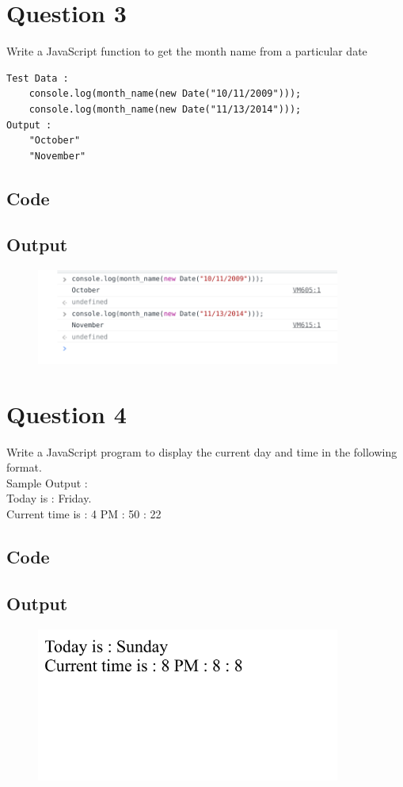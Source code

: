 \documentclass{article}
\begin{document}
\newpage
\section*{Question 3}
Write a JavaScript function to get the month name from a particular date
\begin{lstlisting}
Test Data :
    console.log(month_name(new Date("10/11/2009")));
    console.log(month_name(new Date("11/13/2014")));
Output :
    "October"
    "November"
\end{lstlisting}
\subsection*{Code}

\subsection*{Output}
\begin{figure}[H]
    \centering
    \includegraphics[width=10cm]{3/out.png}
\end{figure}

\newpage
\section*{Question 4}
Write a JavaScript program to display the current day and time in the
following format. \\
Sample Output : \\
Today is : Friday. \\
Current time is : 4 PM : 50 : 22 \\
\subsection*{Code}

\subsection*{Output}
\begin{figure}[H]
    \centering
    \includegraphics[width=10cm]{4/out.png}
\end{figure}
\end{document}
